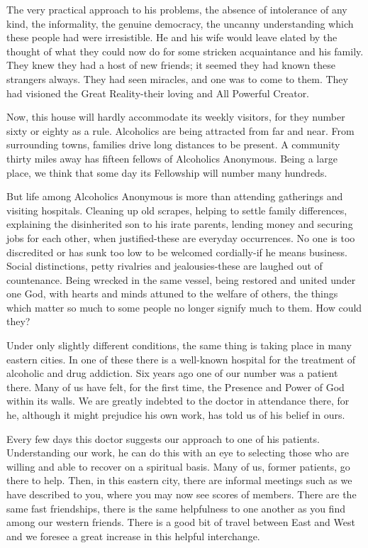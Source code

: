 \begin{biblechapter}
The very practical approach to his problems, the absence of intolerance of any kind, the informality, the genuine democracy, the uncanny understanding which these people had were irresistible.  He and his wife would leave elated by the thought of what they could now do for some stricken acquaintance and his family.  They knew they had a host of new friends; it seemed they had known these strangers always.  They had seen miracles, and one was to come to them.  They had visioned the Great Reality-their loving and All Powerful Creator.

Now, this house will hardly accommodate its weekly visitors, for they number sixty or eighty as a rule.  Alcoholics are being attracted from far and near.  From surrounding towns, families drive long distances to be present.  A community thirty miles away has fifteen fellows of Alcoholics Anonymous.  Being a large place, we think that some day its Fellowship will number many hundreds.

But life among Alcoholics Anonymous is more than attending gatherings and visiting hospitals.  Cleaning up old scrapes, helping to settle family differences, explaining the disinherited son to his irate parents, lending money and securing jobs for each other, when justified-these are everyday occurrences.  No one is too discredited or has sunk too low to be welcomed cordially-if he means business.  Social distinctions, petty rivalries and jealousies-these are laughed out of countenance.  Being wrecked in the same vessel, being restored and united under one God, with hearts and minds attuned to the welfare of others, the things which matter so much to some people no longer signify much to them.  How could they?

Under only slightly different conditions, the same thing is taking place in many eastern cities.  In one of these there is a well-known hospital for the treatment of alcoholic and drug addiction.  Six years ago one of our number was a patient there.  Many of us have felt, for the first time, the Presence and Power of God within its walls.  We are greatly indebted to the doctor in attendance there, for he, although it might prejudice his own work, has told us of his belief in ours.

Every few days this doctor suggests our approach to one of his patients.  Understanding our work, he can do this with an eye to selecting those who are willing and able to recover on a spiritual basis.  Many of us, former patients, go there to help.  Then, in this eastern city, there are informal meetings such as we have described to you, where you may now see scores of members.  There are the same fast friendships, there is the same helpfulness to one another as you find among our western friends.  There is a good bit of travel between East and West and we foresee a great increase in this helpful interchange.


\end{biblechapter}
